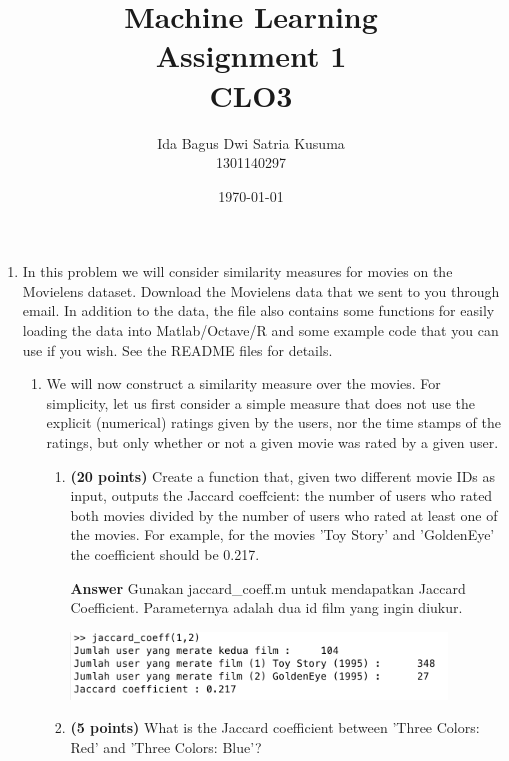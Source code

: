 \documentclass[12pt]{article}%
\begin{document}
\title{Machine Learning \protect\\ Assignment 1 \protect\\ CLO3} 
\author{Ida Bagus Dwi Satria Kusuma \protect\\ 1301140297}
\date{\today}
\maketitle

\begin{enumerate}
	\item In this problem we will consider similarity measures for movies on the Movielens dataset.
Download the Movielens data that we sent to you through email. In addition to the data, the file also contains some functions for easily loading the data into Matlab/Octave/R and some example code that you can use if you wish. See the README files for details.
	\begin{enumerate}	
		\item We will now construct a similarity measure over the movies. For simplicity, let us first consider a simple measure that does not use the explicit (numerical) ratings given by the users, nor the time stamps of the ratings, but only whether or not a given movie was rated by a given user. 
		\begin{enumerate}
			\item \textbf{(20 points)} Create a function that, given two different movie IDs as input, outputs the Jaccard coeffcient: the number of users who rated both movies divided by the number of users who rated at least one of the movies. For example, for the movies 'Toy Story' and 'GoldenEye' the coefficient should be 0.217.

			\par \textbf{Answer} Gunakan jaccard\_coeff.m untuk mendapatkan Jaccard Coefficient. Parameternya adalah dua id film yang ingin diukur.
			\par \includegraphics[width=10cm]{ss_13ai}
				

			\item \textbf{(5 points)} What is the Jaccard coefficient between 'Three Colors: Red' and 'Three Colors: Blue'?


\end{enumerate}
\end{enumerate}
\end{enumerate}
\end{document}
